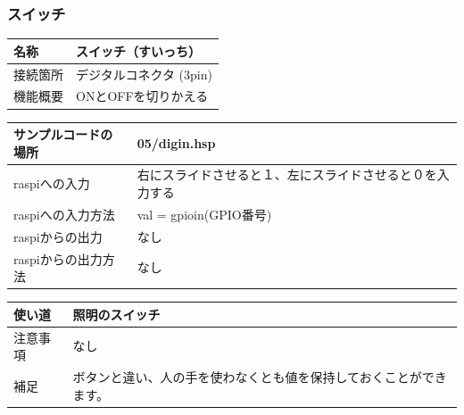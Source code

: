 \subsubsection{スイッチ}\label{switch}
\begin{table}[H]
	\begin{tabular}{|p{\colF}|p{\colG}|}	\hline
	名称 & スイッチ（すいっち）\\ \hline
	接続箇所 & デジタルコネクタ (3pin)\\ \hline
	機能概要 & ONとOFFを切りかえる\\ \hline
  \end{tabular}
\end{table}

\begin{table}[H]
	\begin{tabular}{|p{\colF}|p{\colG}|}	\hline
	サンプルコードの場所 & 05/digin.hsp\\ \hline
	raspiへの入力 & 右にスライドさせると１、左にスライドさせると０を入力する\\ \hline
	raspiへの入力方法 & val = gpioin(GPIO番号)\\ \hline
	raspiからの出力 & なし\\ \hline
	raspiからの出力方法 & なし\\ \hline
  \end{tabular}
\end{table}

\begin{table}[H]
	\begin{tabular}{|p{\colF}|p{\colG}|} \hline
	使い道 & 照明のスイッチ\\ \hline
	注意事項 & なし\\ \hline
	補足 & ボタンと違い、人の手を使わなくとも値を保持しておくことができます。\\ \hline
  \end{tabular}
\end{table}

